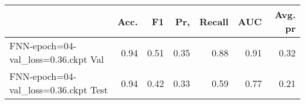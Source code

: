 \begin{tabular}{lrrrrrr}
\toprule
{} &  Acc. &    F1 &   Pr, &  Recall &   AUC &  Avg. pr \\
\midrule
FNN-epoch=04-val\_loss=0.36.ckpt Val  &  0.94 &  0.51 &  0.35 &    0.88 &  0.91 &     0.32 \\
FNN-epoch=04-val\_loss=0.36.ckpt Test &  0.94 &  0.42 &  0.33 &    0.59 &  0.77 &     0.21 \\
\bottomrule
\end{tabular}

